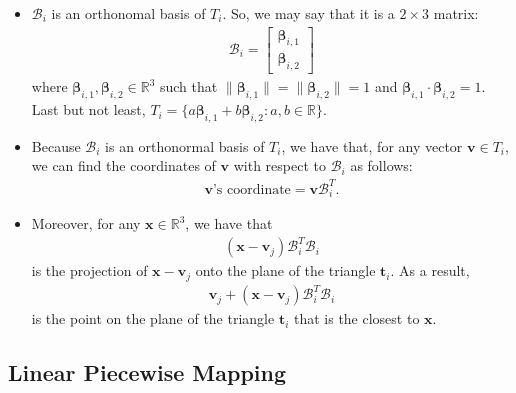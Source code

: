 \documentclass[10pt]{article}
\newcommand{\ve}[1]{\mathbf{#1}}
\newcommand{\ves}[1]{\boldsymbol{#1}}
\newcommand{\mcal}[1]{\mathcal{#1}}
\newcommand{\Real}{\mathbb{R}}
\begin{document}
\begin{itemize}
\begin{itemize}
        \item $\mcal{B}_i$ is an orthonomal basis of $T_i$. So, we may say that it is a $2 \times 3$ matrix:
        \begin{align*}
            \mcal{B}_i = \begin{bmatrix}
                \ves{\beta}_{i,1} \\ 
                \ves{\beta}_{i,2}
            \end{bmatrix}            
        \end{align*}
        where $\ves{\beta}_{i,1}, \ves{\beta}_{i,2} \in \Real^{3}$ such that $\| \ves{\beta}_{i,1} \| = \| \ves{\beta}_{i,2} \| = 1$ and $\ves{\beta}_{i,1} \cdot \ves{\beta}_{i,2} = 1$. Last but not least, $T_i = \{ a \ves{\beta}_{i,1} + b \ves{\beta}_{i,2} : a, b \in \Real \}.$
        
        \item Because $\mcal{B}_i$ is an orthonormal basis of $T_i$, we have that, for any vector $\ve{v} \in T_i$, we can find the coordinates of $\ve{v}$ with respect to $\mcal{B}_i$ as follows:
        \begin{align*}
            \mbox{$\ve{v}$'s coordinate} = \ve{v} \mcal{B}_i^T.
        \end{align*}

        \item Moreover, for any $\ve{x} \in \Real^3$, we have that
        \begin{align*}
            (\ve{x} - \ve{v}_j) \mcal{B}_i^T \mcal{B}_i
        \end{align*}
        is the projection of $\ve{x} - \ve{v}_j$ onto the plane of the triangle $\ve{t}_i$. As a result,
        \begin{align*}
            \ve{v}_j + (\ve{x} - \ve{v}_j) \mcal{B}_i^T \mcal{B}_i
        \end{align*}
        is the point on the plane of the triangle $\ve{t}_i$ that is the closest to $\ve{x}$.        
    \end{itemize}
\end{itemize}

\subsection{Linear Piecewise Mapping}
\end{document}
